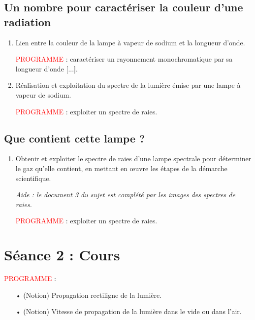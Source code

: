 \documentclass[12pt,a4paper,fleqn]{article}
\newcommand{\prog}{\textcolor{red}{PROGRAMME}}
\begin{document}
\subsection*{Un nombre pour caractériser la \og couleur \fg{} d'une radiation}

\begin{enumerate}[resume]
\item \app{} \anarai{}

Lien entre la couleur de la lampe à vapeur de sodium et la longueur d'onde.

\prog{} : caractériser un rayonnement monochromatique par sa longueur d'onde [...].

\item \rea{} \val{}

Réalisation et exploitation du spectre de la lumière émise par une lampe à vapeur de sodium.

\prog{} : exploiter un spectre de raies.
\end{enumerate}

\subsection*{Que contient cette lampe ?}

\begin{enumerate}[resume]
\item \app{} \anarai{} \rea{} \val{} \com{}

Obtenir et exploiter le spectre de raies d'une lampe spectrale pour déterminer le gaz qu'elle contient, en mettant en œuvre les étapes de la démarche scientifique.

\textit{Aide : le document 3 du sujet est complété par les images des spectres de raies.}

\prog{} : exploiter un spectre de raies.
\end{enumerate}






\newpage
\section*{Séance 2 : Cours}

\noindent
\prog{} :
\begin{itemize}
\item[•] (Notion) Propagation rectiligne de la lumière.
\item[•] (Notion) Vitesse de propagation de la lumière dans le vide ou dans l'air.
\end{itemize}
\end{document}
